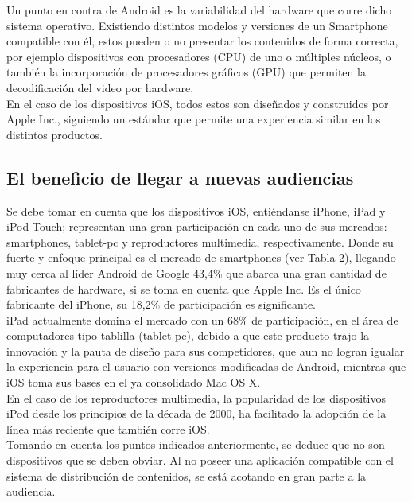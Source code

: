 	Un punto en contra de Android es la variabilidad del hardware que corre dicho sistema operativo. Existiendo distintos modelos y versiones de un Smartphone compatible con él, estos pueden o no presentar los contenidos de forma correcta, por ejemplo dispositivos con procesadores (CPU) de uno o múltiples núcleos, o también la incorporación de procesadores gráficos (GPU) que permiten la decodificación del video por hardware.\\

En el caso de los dispositivos iOS, todos estos son diseñados y construidos por Apple Inc., siguiendo un estándar que permite una experiencia similar en los distintos productos.

\subsection{El beneficio de llegar a nuevas audiencias}
Se debe tomar en cuenta que los dispositivos iOS, entiéndanse iPhone, iPad y iPod Touch; representan una gran participación en cada uno de sus mercados: smartphones, tablet-pc y reproductores  multimedia, respectivamente. Donde su fuerte y enfoque principal es el mercado de smartphones (ver Tabla 2), llegando muy cerca al líder Android de Google 43,4\% que abarca una gran cantidad de fabricantes de hardware, si se toma en cuenta que Apple Inc. Es el único fabricante del iPhone, su 18,2\% de participación es significante.\\

iPad actualmente domina el mercado con un 68\% de participación, en el área de computadores tipo tablilla (tablet-pc), debido a que este producto trajo la innovación y la pauta de diseño para sus competidores, que aun no logran igualar la experiencia para el usuario con versiones modificadas de Android, mientras que iOS toma sus bases en el ya consolidado Mac OS X.\\

En el caso de los reproductores multimedia, la popularidad de los dispositivos iPod desde los principios de la década de 2000, ha facilitado la adopción de la línea más reciente que también corre iOS.\\

Tomando en cuenta los puntos indicados anteriormente, se deduce que no son dispositivos que se deben obviar. Al no poseer una aplicación compatible con el sistema de distribución de contenidos, se está acotando en gran parte a la audiencia.\\

